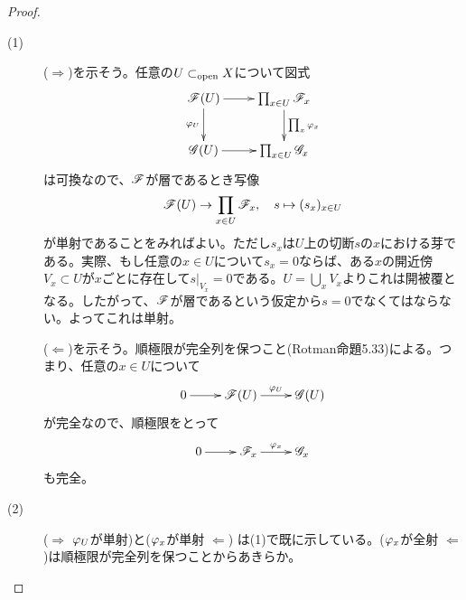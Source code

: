 \begin{proof} ${}$
\begin{description}
  \item[(1)] ($\Rightarrow$)を示そう。任意の$U \subset_{\text{open}} X$について図式
  \[
  \xymatrix{
\scrf(U) \ar[r] \ar[d]_-{\vp_U} & \prod_{x \in U} \scrf_x \ar[d]^-{\prod_x \vp_x} \\
\scrg(U) \ar[r] & \prod_{x \in U} \scrg_x
  }
  \]
  は可換なので、$\mathscr{F}$が層であるとき写像
  \[
  \mathscr{F}(U) \to \prod_{x \in U} \mathscr{F}_x, \quad s \mapsto (s_x)_{x \in U}
  \]
  が単射であることをみればよい。ただし$s_x$は$U$上の切断$s$の$x$における芽である。実際、もし任意の$x \in U$について$s_x = 0$ならば、ある$x$の開近傍$V_x \subset U$が$x$ごとに存在して$s |_{V_x} = 0$である。$U=\bigcup_x V_x$よりこれは開被覆となる。したがって、$\mathscr{F}$が層であるという仮定から$s=0$でなくてはならない。よってこれは単射。

  ($\Leftarrow$)を示そう。順極限が完全列を保つこと(Rotman\cite{Rotman}命題5.33)による。つまり、任意の$x \in U$について
  \[
  \xymatrix{
    0 \ar[r] & \scrf(U) \ar[r]^-{\vp_U}  & \scrg(U)
  }
  \]
  が完全なので、順極限をとって
  \[
  \xymatrix{
    0 \ar[r] & \scrf_x \ar[r]^-{\vp_x}  & \scrg_x
  }
  \]
  も完全。
  \item[(2)]
($\Rightarrow$ ${\varphi}_U$が単射)と(${\varphi}_x$が単射 $\Leftarrow$) は(1)で既に示している。(${\varphi}_x$が全射 $\Leftarrow$)は順極限が完全列を保つことからあきらか。


\end{description}
\end{proof}
